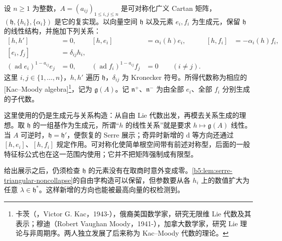 \begin{definition}\label{b5:def:G-kac-moody-presentation}
	设 \(n\ge1\) 为整数，\(A=(a_{ij})_{1\le i,j\le n}\) 是可对称化广义 Cartan 矩阵，\((\mathfrak h,\{h_i\},\{\alpha_i\})\) 是它的复实现。以向量空间 \(\mathfrak h\) 以及元素 \(e_i,f_i\) 为生成元，保留 \(\mathfrak h\) 的线性结构，并施加下列关系：
	\begin{equation}\label{b5:eq:G-chevalley-serre}
		\begin{aligned}
			[h,h']&=0, & [h,e_i]&=\alpha_i(h)e_i, & [h,f_i]&=-\alpha_i(h)f_i,\\
			[e_i,f_j]&=\delta_{ij}h_i,\\
			(\operatorname{ad}e_i)^{1-a_{ij}}e_j&=0, &
			(\operatorname{ad}f_i)^{1-a_{ij}}f_j&=0\qquad(i\ne j).
		\end{aligned}
	\end{equation}
	这里 \(i,j\in\{1,\ldots,n\}\)，\(h,h'\) 遍历 \(\mathfrak h\)，\(\delta_{ij}\) 为 Kronecker 符号。所得代数称为相应的[Kac--Moody algebra]\footnote{卡茨（，Victor G. Kac，1943-），俄裔美国数学家，研究无限维 Lie 代数及其表示；穆迪（Robert Vaughan Moody，1941-），加拿大数学家，研究 Lie 理论与非周期序。两人独立发展了后来称为 Kac--Moody 代数的理论。}，记为 \(\mathfrak g(A)\)。记 \(\mathfrak n^+\)、\(\mathfrak n^-\) 为由全部 \(e_i\)、全部 \(f_i\) 分别生成的子代数。
\end{definition}

这里使用的仍是生成元与关系构造：从自由 Lie 代数出发，再模去关系生成的理想。取 \(\mathfrak h\) 的一组基作为生成元，所谓“\(h\) 的线性关系”就是要求 \(h\mapsto\mathfrak g(A)\) 线性。当 \(A\) 可逆时，\(\mathfrak h=\mathfrak h'\)，便恢复的 Serre 展示；奇异时新增的 \(\mathrm d\) 等方向还通过 \([h,e_i]\)、\([h,f_i]\) 规定作用。可对称化使简单根空间带有前述对称型，后面的一般特征标公式也在这一范围内使用；它并不把矩阵强制成有限型。

\ProseParagraphBreak

给出展示之后，仍须检查 \(\mathfrak h\) 的元素没有在取商时意外变成零。\cref{b5:lem:serre-triangular-noncollapse}的自由字构造可以保留，但参数要从各 \(h_i\) 上的数值扩大为任意 \(\lambda\in\mathfrak h^*\)。这样新增的方向也能被最高向量的权检测到。

